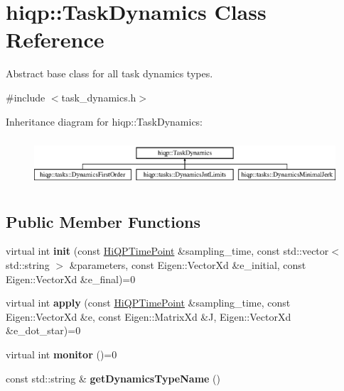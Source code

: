 \hypertarget{classhiqp_1_1TaskDynamics}{\section{hiqp\-:\-:Task\-Dynamics Class Reference}
\label{classhiqp_1_1TaskDynamics}
}


Abstract base class for all task dynamics types.  




{\ttfamily \#include $<$task\-\_\-dynamics.\-h$>$}

Inheritance diagram for hiqp\-:\-:Task\-Dynamics\-:\begin{figure}[H]
\begin{center}
\leavevmode
\includegraphics[height=1.812298cm]{classhiqp_1_1TaskDynamics}
\end{center}
\end{figure}
\subsection*{Public Member Functions}
\begin{DoxyCompactItemize}
\item 
\hypertarget{classhiqp_1_1TaskDynamics_a40d177e44645d0188f44788bde0adba0}{virtual int {\bfseries init} (const \hyperlink{classhiqp_1_1HiQPTimePoint}{Hi\-Q\-P\-Time\-Point} \&sampling\-\_\-time, const std\-::vector$<$ std\-::string $>$ \&parameters, const Eigen\-::\-Vector\-Xd \&e\-\_\-initial, const Eigen\-::\-Vector\-Xd \&e\-\_\-final)=0}\label{classhiqp_1_1TaskDynamics_a40d177e44645d0188f44788bde0adba0}

\item 
\hypertarget{classhiqp_1_1TaskDynamics_a12685734a0307147bcc453bd315a32f0}{virtual int {\bfseries apply} (const \hyperlink{classhiqp_1_1HiQPTimePoint}{Hi\-Q\-P\-Time\-Point} \&sampling\-\_\-time, const Eigen\-::\-Vector\-Xd \&e, const Eigen\-::\-Matrix\-Xd \&J, Eigen\-::\-Vector\-Xd \&e\-\_\-dot\-\_\-star)=0}\label{classhiqp_1_1TaskDynamics_a12685734a0307147bcc453bd315a32f0}

\item 
\hypertarget{classhiqp_1_1TaskDynamics_a1ab7af71fd1774068e540656dc00af49}{virtual int {\bfseries monitor} ()=0}\label{classhiqp_1_1TaskDynamics_a1ab7af71fd1774068e540656dc00af49}

\item 
\hypertarget{classhiqp_1_1TaskDynamics_a68dc5c02721b9665bb5e49a8a0a5cadc}{const std\-::string \& {\bfseries get\-Dynamics\-Type\-Name} ()}\label{classhiqp_1_1TaskDynamics_a68dc5c02721b9665bb5e49a8a0a5cadc}

\end{DoxyCompactItemize}
